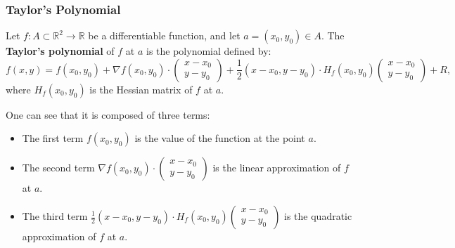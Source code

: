 \documentclass[11pt]{article}
\begin{document}
\pagebreak

\subsubsection{Taylor's Polynomial}
Let \(f : A \subset \mathbb{R}^2 \to \mathbb{R}\) be a differentiable function, and let \(a = (x_0, y_0) \in A\). The \textbf{Taylor's polynomial} of \(f\) at \(a\) is the polynomial defined by:
\[f(x, y) = f(x_0, y_0) + \nabla f(x_0, y_0) \cdot \begin{pmatrix} x - x_0 \\ y - y_0 \end{pmatrix} + \frac{1}{2} (x - x_0, y - y_0) \cdot H_f(x_0, y_0) \begin{pmatrix} x - x_0 \\ y - y_0 \end{pmatrix} + R,\]
where \(H_f(x_0, y_0)\) is the Hessian matrix of \(f\) at \(a\).

One can see that it is composed of three terms:
\begin{itemize}
    \item The first term \(f(x_0, y_0)\) is the value of the function at the point \(a\).
    \item The second term \(\nabla f(x_0, y_0) \cdot \begin{pmatrix} x - x_0 \\ y - y_0 \end{pmatrix}\) is the linear approximation of \(f\) at \(a\).
    \item The third term \(\frac{1}{2} (x - x_0, y - y_0) \cdot H_f(x_0, y_0) \begin{pmatrix} x - x_0 \\ y - y_0 \end{pmatrix}\) is the quadratic approximation of \(f\) at \(a\).
\end{itemize}
\end{document}
